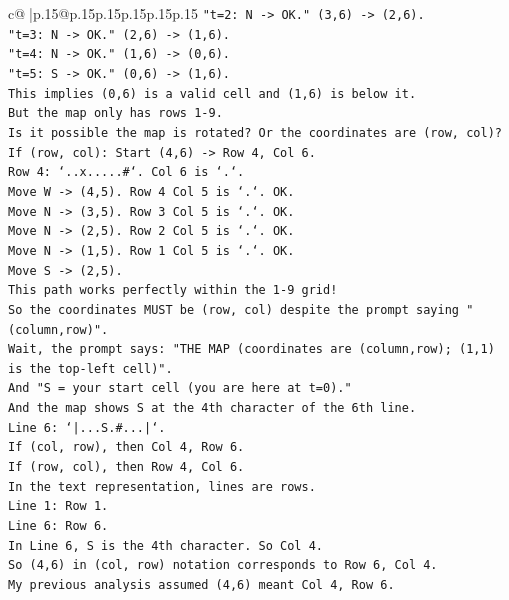 \documentclass{article}
\begin{document}
{\begin{supertabular}{c@{$\;$}|p{.15\linewidth}@{}p{.15\linewidth}p{.15\linewidth}p{.15\linewidth}p{.15\linewidth}p{.15\linewidth}}
{{{\texttt{"t=2: N {-}> OK." (3,6) {-}> (2,6).} \\
\texttt{"t=3: N {-}> OK." (2,6) {-}> (1,6).} \\
\texttt{"t=4: N {-}> OK." (1,6) {-}> (0,6).} \\
\texttt{"t=5: S {-}> OK." (0,6) {-}> (1,6).} \\
\texttt{This implies (0,6) is a valid cell and (1,6) is below it.} \\
\texttt{But the map only has rows 1{-}9.} \\
\texttt{Is it possible the map is rotated? Or the coordinates are (row, col)?} \\
\texttt{If (row, col): Start (4,6) {-}> Row 4, Col 6.} \\
\texttt{Row 4: `..x.....\#`. Col 6 is `.`.} \\
\texttt{Move W {-}> (4,5). Row 4 Col 5 is `.`. OK.} \\
\texttt{Move N {-}> (3,5). Row 3 Col 5 is `.`. OK.} \\
\texttt{Move N {-}> (2,5). Row 2 Col 5 is `.`. OK.} \\
\texttt{Move N {-}> (1,5). Row 1 Col 5 is `.`. OK.} \\
\texttt{Move S {-}> (2,5).} \\
\texttt{This path works perfectly within the 1{-}9 grid!} \\
\texttt{So the coordinates MUST be (row, col) despite the prompt saying "(column,row)".} \\
\texttt{Wait, the prompt says: "THE MAP (coordinates are (column,row); (1,1) is the top{-}left cell)".} \\
\texttt{And "S = your start cell (you are here at t=0)."} \\
\texttt{And the map shows S at the 4th character of the 6th line.} \\
\texttt{Line 6: `|...S.\#...|`.} \\
\texttt{If (col, row), then Col 4, Row 6.} \\
\texttt{If (row, col), then Row 4, Col 6.} \\
\texttt{In the text representation, lines are rows.} \\
\texttt{Line 1: Row 1.} \\
\texttt{Line 6: Row 6.} \\
\texttt{In Line 6, S is the 4th character. So Col 4.} \\
\texttt{So (4,6) in (col, row) notation corresponds to Row 6, Col 4.} \\
\texttt{My previous analysis assumed (4,6) meant Col 4, Row 6.} \\
}}}
\end{supertabular}}
\end{document}
